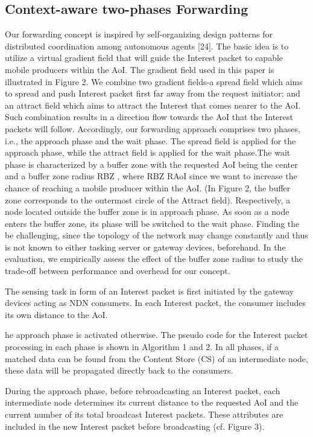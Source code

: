 \documentclass[10pt, conference, compsocconf]{IEEEtran}
\begin{document}
\subsection{Context-aware two-phases Forwarding}

Our forwarding concept is inspired by self-organizing design patterns for distributed coordination among autonomous agents [24]. The basic idea is to utilize  a  virtual  gradient ﬁeld that will guide the Interest packet to capable mobile producers within the AoI. The gradient ﬁeld used in this paper is illustrated in Figure 2. We combine two gradient ﬁelds-a spread ﬁeld which aims to spread and push Interest packet ﬁrst far away from the request initiator; and an attract ﬁeld which aims to attract the Interest that comes nearer to the AoI. Such combination results in a direction ﬂow towards the AoI that the Interest packets will follow. Accordingly, our forwarding approach comprises two phases, i.e., the approach phase and the wait phase. The spread ﬁeld is applied for the approach phase, while the attract ﬁeld is applied for the wait phase.The wait phase is characterized by a buffer zone with the requested AoI being the center and a buffer zone radius RBZ , where RBZ RAoI since we want to increase the chance of reaching a mobile producer within the AoI. (In Figure 2, the buffer zone corresponds to the outermost circle of the Attract ﬁeld). Respectively, a node located outside the buffer zone is in approach phase. As soon as a node enters the buffer zone, its phase will be switched to the wait phase. Finding  the be challenging, since the topology of the network may change constantly and thus is not known to either tasking server or gateway devices, beforehand. In the evaluation, we empirically assess the effect of the buffer zone radius to study the trade-off between performance and overhead for our concept.

The sensing task in form of an Interest packet is first initiated by the gateway devices acting as NDN consumers. In each Interest packet, the consumer includes its own distance to the AoI.

he approach phase is activated otherwise. The pseudo code for the Interest packet processing in each phase is shown in Algorithm 1 and 2. In all phases, if a matched data can be found from the Content Store (CS) of an intermediate node, these data will be propagated directly back to the consumers.

During the approach phase, before rebroadcasting an Interest packet, each intermediate node determines its current distance to the requested AoI and the current number of its total broadcast Interest packets. These attributes are included in the new Interest packet before broadcasting (cf. Figure 3).
\end{document}
